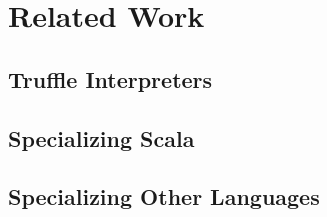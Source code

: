 
\chapter{Related Work}

\section{Truffle Interpreters}

\section{Specializing Scala}

\section{Specializing Other Languages}